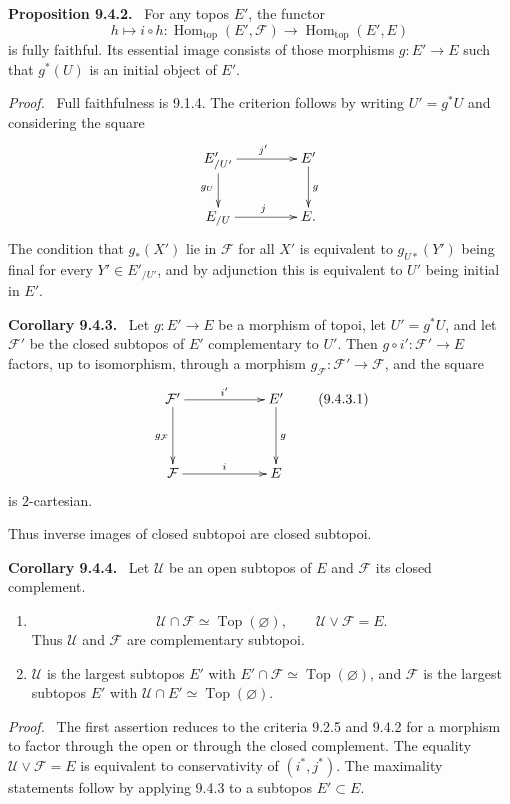 \documentclass[11pt]{article}
\newcommand{\Uu}{\mathcal{U}}
\newcommand{\Ff}{\mathcal{F}}
\newcommand{\Top}{\operatorname{Top}}
\newcommand{\Homtop}{\operatorname{Hom}_{\mathrm{top}}}
\newcommand{\emptytopos}{\Top(\varnothing)}
\newenvironment{statement}[1]{\par\medskip\noindent\textbf{#1.}\ }{\par\medskip}
\newenvironment{prooftext}{\par\noindent\emph{Proof.}\ }{\par\medskip}
\begin{document}
\begin{statement}{Proposition 9.4.2}
For any topos \(E'\), the functor
\[
h\longmapsto i\circ h:\Homtop(E',\Ff)\longrightarrow\Homtop(E',E)
\]
is fully faithful. Its essential image consists of those morphisms \(g:E'\to E\) such that \(g^*(U)\) is an initial object of \(E'\).
\end{statement}

\begin{prooftext}
Full faithfulness is 9.1.4. The criterion follows by writing \(U'=g^*U\) and considering the square
\[
\xymatrix@C=1.5cm{
E'_{/U'}\ar[r]^{j'}\ar[d]_{g_U}&E'\ar[d]^g\\
E_{/U}\ar[r]^j&E.
}
\]
The condition that \(g_*(X')\) lie in \(\Ff\) for all \(X'\) is equivalent to \(g_{U*}(Y')\) being final for every \(Y'\in E'_{/U'}\), and by adjunction this is equivalent to \(U'\) being initial in \(E'\).
\end{prooftext}

\begin{statement}{Corollary 9.4.3}
Let \(g:E'\to E\) be a morphism of topoi, let \(U'=g^*U\), and let \(\Ff'\) be the closed subtopos of \(E'\) complementary to \(U'\). Then \(g\circ i':\Ff'\to E\) factors, up to isomorphism, through a morphism \(g_\Ff:\Ff'\to\Ff\), and the square
\[
\xymatrix@C=2cm@R=1.4cm{
\Ff'\ar[r]^{i'}\ar[d]_{g_\Ff}&E'\ar[d]^g\\
\Ff\ar[r]^i&E
}
\tag{9.4.3.1}
\]
is \(2\)-cartesian.
\end{statement}

Thus inverse images of closed subtopoi are closed subtopoi.

\begin{statement}{Corollary 9.4.4}
Let \(\Uu\) be an open subtopos of \(E\) and \(\Ff\) its closed complement.
\begin{enumerate}[label=\alph*)]
\item
\[
\Uu\cap\Ff\simeq\emptytopos,\qquad \Uu\vee\Ff=E.
\]
Thus \(\Uu\) and \(\Ff\) are complementary subtopoi.
\item \(\Uu\) is the largest subtopos \(E'\) with \(E'\cap\Ff\simeq\emptytopos\), and \(\Ff\) is the largest subtopos \(E'\) with \(\Uu\cap E'\simeq\emptytopos\).
\end{enumerate}
\end{statement}

\begin{prooftext}
The first assertion reduces to the criteria 9.2.5 and 9.4.2 for a morphism to factor through the open or through the closed complement. The equality \(\Uu\vee\Ff=E\) is equivalent to conservativity of \((i^*,j^*)\). The maximality statements follow by applying 9.4.3 to a subtopos \(E'\subset E\).
\end{prooftext}
\end{document}
